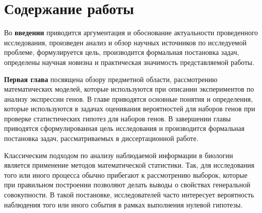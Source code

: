 \section*{Содержание работы}
Во \textbf{введении} приводится аргументация и обоснование актуальности проведенного исследования, произведен анализ и обзор научных источников по исследуемой проблеме, формулируется цель, производится формальная постановка задач, определены научная новизна и практическая значимость представляемой работы.


\textbf{Первая глава} посвящена обзору предметной области, рассмотрению математических моделей, которые используются при описании экспериментов по анализу экспрессии генов.
В главе приводятся основные понятия и определения, которые используются в задачах оценивания вероятностей для наборов генов при проверке статистических гипотез для наборов генов.
В завершении главы приводятся сформулированная цель исследования и производится формальная постановка задач, рассматриваемых в диссертационной работе.

Классическим подходом по анализу наблюдаемой информации в биологии является применение методов математической статистики.
Так, для исследования того или иного процесса обычно прибегают к рассмотрению выборок, которые при правильном построении позволяют делать выводы о свойствах генеральной совокупности. 
В такой постановке, исследователей часто интересует вероятность наблюдения того или иного события в рамках выполнения нулевой гипотезы.

